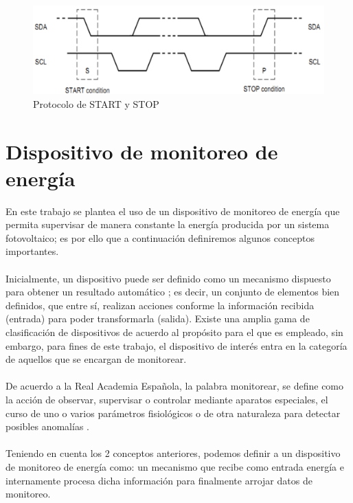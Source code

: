 \begin{figure}[H]
	\centering
	\includegraphics[scale=.25]{Capitulo2/images/startstop.png}
	\caption{Protocolo de START y STOP}
	\label{fig:}
\end{figure}




\section{Dispositivo de monitoreo de energía}
En este trabajo se plantea el uso de un dispositivo de monitoreo de energía que permita supervisar de manera constante la energía producida por un sistema fotovoltaico; es por ello que a continuación definiremos algunos conceptos importantes.
\paragraph{}
Inicialmente, un dispositivo puede ser definido como un mecanismo dispuesto para obtener un resultado automático \citep{MarcoTeorico11}; es decir, un conjunto de elementos bien definidos, que entre sí, realizan acciones conforme la información recibida (entrada) para poder transformarla (salida).
Existe una amplia gama de clasificación de dispositivos de acuerdo al propósito para el que es empleado, sin embargo, para fines de este trabajo, el dispositivo de interés entra en la categoría de aquellos que se encargan de monitorear. 
\paragraph{}
De acuerdo a la Real Academia Española, la palabra monitorear, se define como la acción de observar, supervisar o controlar mediante aparatos especiales, el curso de uno o varios parámetros fisiológicos o de otra naturaleza para detectar posibles anomalías \citep{MarcoTeorico12}.
\paragraph{}
Teniendo en cuenta los 2 conceptos anteriores, podemos definir a un dispositivo de monitoreo de energía como: un mecanismo que recibe como entrada energía e internamente procesa dicha información para finalmente arrojar datos de monitoreo.


